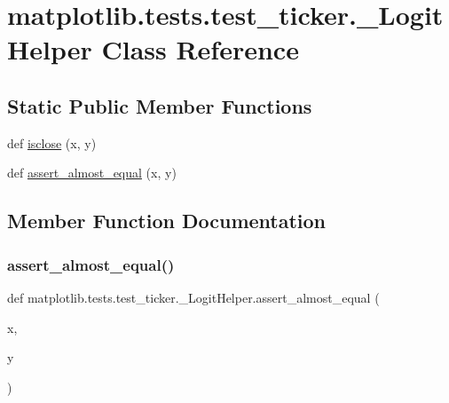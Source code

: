 \hypertarget{classmatplotlib_1_1tests_1_1test__ticker_1_1__LogitHelper}{}\section{matplotlib.\+tests.\+test\+\_\+ticker.\+\_\+\+Logit\+Helper Class Reference}
\label{classmatplotlib_1_1tests_1_1test__ticker_1_1__LogitHelper}
\subsection*{Static Public Member Functions}
\begin{DoxyCompactItemize}
\item 
def \hyperlink{classmatplotlib_1_1tests_1_1test__ticker_1_1__LogitHelper_a34d99e0af5177a855d47f774fcb8301c}{isclose} (x, y)
\item 
def \hyperlink{classmatplotlib_1_1tests_1_1test__ticker_1_1__LogitHelper_ad5bd01261063ea6f9979ee83ab89cdab}{assert\+\_\+almost\+\_\+equal} (x, y)
\end{DoxyCompactItemize}


\subsection{Member Function Documentation}
\mbox{\label{classmatplotlib_1_1tests_1_1test__ticker_1_1__LogitHelper_ad5bd01261063ea6f9979ee83ab89cdab}} 
\subsubsection{\texorpdfstring{assert\+\_\+almost\+\_\+equal()}{assert\_almost\_equal()}}
{\footnotesize\ttfamily def matplotlib.\+tests.\+test\+\_\+ticker.\+\_\+\+Logit\+Helper.\+assert\+\_\+almost\+\_\+equal (\begin{DoxyParamCaption}\item[{}]{x,  }\item[{}]{y }\end{DoxyParamCaption})\hspace{0.3cm}{\ttfamily [static]}}

